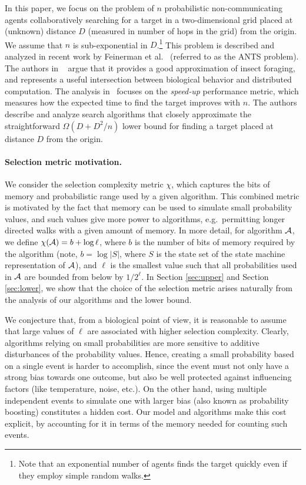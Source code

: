 \documentclass[11pt]{article}
\begin{document}
In this paper, we focus on the problem of $n$ probabilistic non-communicating agents collaboratively searching for a target in a two-dimensional grid placed at (unknown) distance $D$ (measured in number of hops in the grid) from the origin. We assume that $n$ is sub-exponential in $D$.\footnote{Note that an exponential number of agents finds the target quickly even if they employ simple random walks.} This problem is described and analyzed in recent work by Feinerman et al.~\cite{feinerman12podc} (referred to as the ANTS problem). The authors in ~\cite{feinerman12podc} argue that it provides a good approximation of insect foraging, and represents a useful intersection between biological behavior and distributed computation. The analysis in~\cite{feinerman12podc} focuses on the {\em speed-up} performance metric, which measures how the expected time to find the target improves with $n$. The authors describe and analyze search algorithms that closely approximate the straightforward $\Omega(D + D^2/n)$ lower bound for finding a target placed at distance $D$ from the origin.
 
 \paragraph{Selection metric motivation.} We consider the selection complexity metric $\chi$, which captures the bits of memory and probabilistic range used by a given algorithm. This combined metric is motivated by the fact that memory can be used to simulate small probability values, and such values give more power to algorithms, e.g.\ permitting longer directed walks with a given amount of memory. In more detail, for algorithm ${\cal A}$, we define $\chi({\cal A}) = b + \log{\ell}$, where $b$ is the number of bits of memory required by the algorithm (note, $b = \log{|S|}$, where $S$ is the state set of the state machine representation of ${\cal A}$), and $\ell$ is the smallest value such that all probabilities used in ${\cal A}$ are bounded from below by $1/2^\ell$. In Section \ref{sec:upper} and Section \ref{sec:lower}, we show that the choice of the selection metric arises naturally from the analysis of our algorithms and the lower bound.

We conjecture that, from a biological point of view, it is reasonable to assume that large values of $\ell$ are associated with higher selection complexity. Clearly, algorithms relying on small probabilities are more sensitive to additive disturbances of the probability values. Hence, creating a small probability based on a single event is harder to accomplish, since the  event must not only have a strong bias towards one outcome, but also be well protected against influencing factors (like temperature, noise, etc.). On the other hand, using multiple independent events to simulate one with larger bias (also known as probability boosting) constitutes a hidden cost. Our model and algorithms make this cost explicit, by accounting for it in terms of the memory needed for counting such events.
\end{document}
